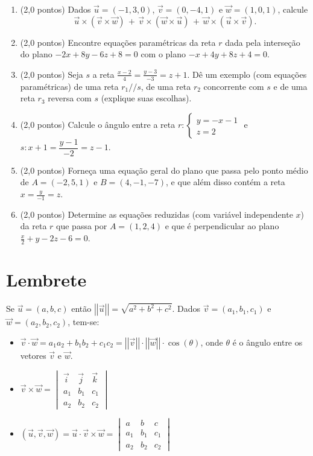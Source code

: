 \documentclass[12pt,a4paper]{article}
\newcommand{\norm}[1]{\left|\left|{#1}\right|\right|}
\begin{document}
\begin{enumerate}
\item (2,0 pontos) Dados $\vec{u}=(-1,3,0)$, $\vec{v}=(0,-4,1)$ e $\vec{w}=(1,0,1)$, calcule
\[
  \vec{u} \times (\vec{v} \times \vec{w}) \, + \,
  \vec{v} \times (\vec{w} \times \vec{u}) \, + \,
  \vec{w} \times (\vec{u} \times \vec{v}).
\]

\item (2,0 pontos) Encontre equações paramétricas da reta $r$ dada pela interseção do plano $-2x + 8y - 6z + 8 = 0$ com o plano $-x + 4y + 8z + 4 = 0$.

\item (2,0 pontos) Seja $s$ a reta $\frac{x - 2}{4} = \frac{y - 3}{-3} = z + 1$. Dê um exemplo (com equações paramétricas) de uma reta $r_1 // s$, de uma reta $r_2$ concorrente com $s$ e de uma reta $r_3$ reversa com $s$ (explique suas escolhas).


\item (2,0 pontos) Calcule o ângulo entre a reta $r : \begin{cases}
y = -x -1 \\
z = 2
\end{cases}$ e $s: x+1 = \dfrac{y-1}{-2} = z-1$.

\item (2,0 pontos) Forneça uma equação geral do plano que passa pelo ponto médio de $A = (-2,5,1)$ e $B = (4,-1,-7)$, e que além disso contém a reta $x = \frac{y}{-1} = z$.

\item (2,0 pontos) Determine as equações reduzidas (com variável independente $x$) da reta $r$ que passa por $A = (1,2,4)$ e que é perpendicular ao plano $\frac{x}{2} + y - 2z - 6 = 0$.
\end{enumerate}

\section*{Lembrete}
Se $\vec{u} = (a,b,c)$ então $\norm{\vec{u}} = \sqrt{a^2 + b^2 + c^2}$. Dados $\vec{v} = (a_1, b_1, c_1)$ e $\vec{w} = (a_2, b_2, c_2)$, tem-se:

\begin{itemize}
\item $\vec{v} \cdot \vec{w}
= a_1 a_2 + b_1 b_2 + c_1 c_2
= \norm{\vec{v}} \cdot \norm{\vec{w}} \cdot \cos(\theta)
$, onde $\theta$ é o ângulo entre os vetores $\vec{v}$ e $\vec{w}$.
\item $\vec{v} \times \vec{w}
= \begin{vmatrix}
\vec{i} & \vec{j} & \vec{k} \\
a_1 & b_1 & c_1\\
a_2 & b_2 & c_2
\end{vmatrix}$
\item $(\vec{u}, \vec{v}, \vec{w})
= \vec{u} \cdot \vec{v} \times \vec{w}
= \begin{vmatrix}
a   & b   & c \\
a_1 & b_1 & c_1 \\
a_2 & b_2 & c_2
\end{vmatrix}$
\end{itemize}
\end{document}
